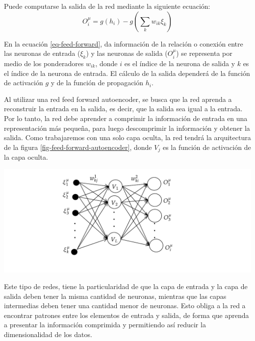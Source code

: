 \documentclass[aps,prl,reprint,groupedaddress]{revtex4-2}
\newenvironment{Figura}
  {\par\medskip\noindent\minipage{\linewidth}}
  {\endminipage\par\medskip}
\begin{document}
Puede computarse la salida de la red mediante la siguiente ecuación:
\begin{equation}
  O^{\mu}_{i} = g(h_{i}) - g \left( \sum_{k} w_{ik} \xi_{k} \right)
  \label{eq-feed-forward}
\end{equation}

En la ecuación \ref{eq-feed-forward}, da información de la relación o conexión 
entre las neuronas de entrada ($\xi_{k}$) y las neuronas de salida 
($O^{\mu}_{i}$) se representa por medio de los ponderadores $w_{ik}$, 
donde $i$ es el índice de la neurona de salida y $k$ es el índice de la 
neurona de entrada. El cálculo de la salida dependerá de la función de 
activación $g$ y de la función de propagación $h_{i}$.

Al utilizar una red feed forward autoencoder, se busca que la red aprenda a
reconstruir la entrada en la salida, es decir, que la salida sea igual a la 
entrada. Por lo tanto, la red debe aprender a comprimir la información de 
entrada en una representación más pequeña, para luego descomprimir la 
información y obtener la salida. Como trabajaremos con una solo capa oculta, 
la red tendrá la arquitectura de la figura \ref{fig-feed-forward-autoencoder},
donde $V_{j}$ es la función de activación de la capa oculta.

\begin{Figura}
  \centering
  \includegraphics[width=1\textwidth]{figs/red-autoencoder.pdf}
  \label{fig-feed-forward-autoencoder}
\end{Figura}

Este tipo de redes, tiene la particularidad de que la capa de entrada y la capa 
de salida deben tener la misma cantidad de neuronas, mientras que las capas 
intermedias deben tener una cantidad menor de neuronas. Esto obliga a la red a 
encontrar patrones entre los elementos de entrada y salida, de forma que aprenda 
a presentar la información comprimida y permitiendo así reducir la dimensionalidad 
de los datos. 
\end{document}
